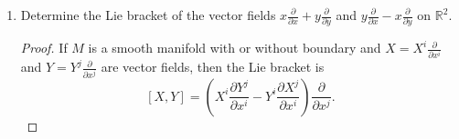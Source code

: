 \documentclass{article}
\begin{document}
\begin{enumerate}
\begin{proof}
		Finally, we change coordinates on $x,y$, leaving their differentials unchanged, then we substitute using the expressions for $\partial/ \partial x$ and $\partial/ \partial y$ which we found above and reduce using the Pythagorean trigonometric identity to see that the vector field in terms of cylindrical coordinates is:
%		
		\begin{align*}
			(x^2+y^2)^{-2/3} \left ( x \frac{\partial}{\partial x} + y \frac{\partial}{\partial y} \right) 
			&=  ((r \cos \theta)^2+(r \sin \theta)^2)^{-2/3} \left ( (r \cos \theta) \frac{\partial}{\partial x} + (r \sin \theta) \frac{\partial}{\partial y} \right) \\
			&= r^{-4/3} \left ( (r \cos \theta) \frac{\partial}{\partial x} + (r \sin \theta) \frac{\partial}{\partial y} \right) \\
			&=  r^{-4/3} \left ( (r \cos \theta)\left(\cos \theta  \frac{\partial }{\partial r}  - \frac{\sin \theta}{r}\frac{\partial }{\partial \theta} \right) + (r \sin \theta)\left ( \sin \theta \frac{\partial}{\partial r} + \frac{\cos \theta}{r} \frac{\partial}{\partial \theta} \right ) \right) \\
			&= r^{-4/3} \left ( (r \cos^2 \theta + r \sin^2 \theta) \frac{\partial}{\partial r} + ( - \sin \theta \cos \theta + \cos \theta \sin \theta ) \frac{\partial}{\partial \theta} \right) \\
			&= r^{-4/3} \left ( r \frac{\partial}{\partial r}  \right)\\
			&= \frac{1}{\sqrt[3]{r}} \frac{\partial}{\partial r} 
			\end{align*}
	\end{proof}
	
	\item Determine the Lie bracket of the vector fields $x \frac{\partial}{\partial x} + y \frac{\partial}{\partial y}$ and $y \frac{\partial}{\partial x} - x \frac{\partial}{\partial y}$ on $\mathbb{R}^2$.
	
	
	\begin{proof}
		If $M$ is a smooth manifold with or without boundary and 
		$X = X^i \frac{\partial}{\partial x^i}$ and $Y = Y^j \frac{\partial}{\partial x^j}$
		are vector fields, then the Lie bracket is 
		\[ [X,Y] = \left ( X^i \frac{\partial Y^j}{\partial x^i} - Y^i \frac{ \partial X^j}{\partial x^i} \right ) \frac{\partial }{\partial x^j}.\]
		

\end{proof}
\end{enumerate}
\end{document}
